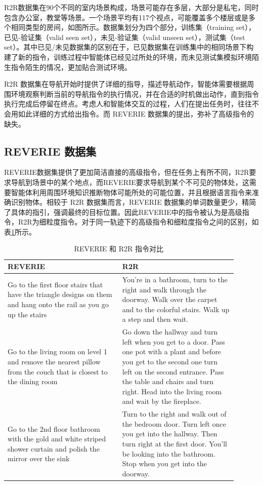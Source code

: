 \documentclass[bachelor]{thesis-uestc}
\begin{document}
R2R数据集在90个不同的室内场景构成，场景可能存在多层，大部分是私宅，同时包含办公室，教堂等场景。一个场景平均有117个视点，可能覆盖多个楼层或是多个相同类型的房间，如图所示。数据集划分为四个部分，训练集（training set），已见-验证集（valid seen set），未见-验证集（valid unseen set），测试集（test set）。其中已见/未见数据集的区别在于，已见数据集在训练集中的相同场景下构建了新的指令，训练过程中智能体已经见过所处的环境，而未见测试集模拟环境陌生指令陌生的情况，更加贴合测试环境。


R2R 数据集在导航开始时提供了详细的指导，描述导航动作，智能体需要根据周围环境观察判断当前的导航指令的执行情况，并在合适的时机做出动作，直到指令执行完成后停留在终点。考虑人和智能体交互的过程，人们在提出任务时，往往不会用如此详细的方式给出指令。而 REVERIE 数据集的提出，弥补了高级指令的缺失。

\subsection{REVERIE 数据集}
REVERIE数据集提供了更加简洁直接的高级指令，但在任务上有所不同，R2R要求导航到场景中的某个地点，而REVERIE要求导航到某个不可见的物体处，这需要智能体利用周围环境知识推断物体可能所处的可能位置，并且根据语言指令来准确识别物体。相较于 R2R 数据集而言，REVERIE 数据集的单词数量更少，精简了具体的指引，强调最终的目标位置。因此REVERIE中的指令被认为是高级指令，R2R为细粒度指令。对于同一轨迹下的高级指令和细粒度指令之间的区别，如表\ref{rvr2r}所示。

\begin{table}[h]
    \centering
    \caption{REVERIE 和 R2R 指令对比}
    \label{rvr2r}
    \begin{tabular}{@{}p{0.45\linewidth}p{0.45\linewidth}@{}}
    \toprule
    \textbf{REVERIE} & \textbf{R2R} \\ \midrule
    Go to the first floor stairs that have the triangle designs on them and hang onto the rail as you go up the stairs & You're in a bathroom, turn to the right and walk through the doorway. Walk over the carpet and to the colorful stairs. Walk up a step and then wait. \\
    Go to the living room on level 1 and remove the nearest pillow from the couch that is closest to the dining room & Go down the hallway and turn left when you get to a door. Pass one pot with a plant and before you get to the second one turn left on the second entrance. Pass the table and chairs and turn right. Head into the living room and wait by the fireplace. \\
    Go to the 2nd floor bathroom with the gold and white striped shower curtain and polish the mirror over the sink & Turn to the right and walk out of the bedroom door. Turn left once you get into the hallway. Then turn right at the first door. You'll be looking into the bathroom. Stop when you get into the doorway. \\
    \bottomrule
    \end{tabular}
    \end{table}
\end{document}
